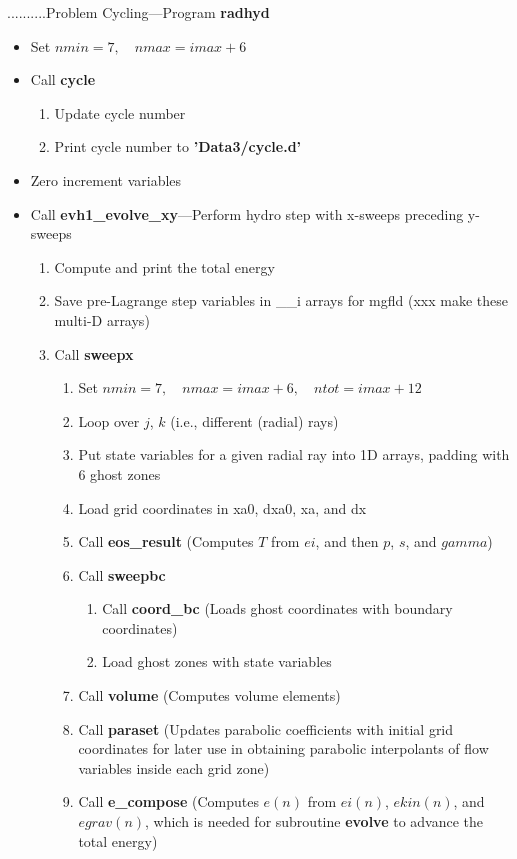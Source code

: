 \documentclass[11pt,doublespace]{article}
\begin{document}
\bigskip

\noindent..........{\Large Problem Cycling}---Program {\bf radhyd}

\begin{itemize}
  \item Set $nmin = 7, \quad nmax= imax + 6$
  \item Call {\bf cycle}
\begin{enumerate}
  \item Update cycle number
  \item Print cycle number to {\bf 'Data3/cycle.d' }
\end{enumerate}
  \item Zero increment variables
  \item Call {\bf evh1\_evolve\_xy}---Perform hydro step with x-sweeps preceding y-sweeps
\begin{enumerate}
  \item Compute and print the total energy
  \item Save pre-Lagrange step variables in \_\_i arrays for mgfld (xxx make these multi-D arrays)
  \item Call {\bf sweepx}
\begin{enumerate}
  \item Set $nmin = 7, \quad nmax = imax+6, \quad ntot = imax+12$
  \item Loop over $j$, $k$ (i.e., different (radial) rays)
  \item Put state variables for a given radial ray into 1D arrays, padding with 6 ghost zones
  \item Load grid coordinates in xa0, dxa0, xa, and dx
  \item Call {\bf eos\_result} (Computes $T$ from $ei$, and then $p$, $s$, and $gamma$)
  \item Call {\bf sweepbc}
\begin{enumerate}
  \item Call {\bf coord\_bc} (Loads ghost coordinates with boundary coordinates)
  \item Load ghost zones with state variables
\end{enumerate}
  \item Call {\bf volume} (Computes volume elements)
  \item Call {\bf paraset} (Updates parabolic coefficients with initial grid coordinates for later use in obtaining parabolic interpolants of flow variables inside each grid zone)
  \item Call {\bf e\_compose} (Computes $e(n)$ from $ei(n)$, $ekin(n)$, and $egrav(n)$, which is needed for subroutine {\bf evolve} to advance the total energy)

\end{enumerate}
\end{enumerate}
\end{itemize}
\end{document}
